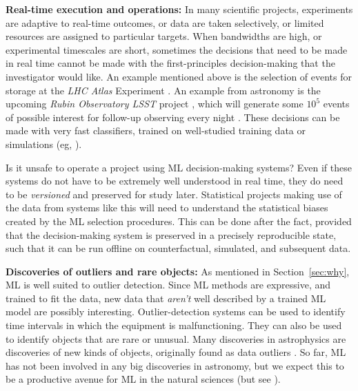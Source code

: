 \documentclass{article}
\renewcommand{\paragraph}[1]{\noindent\par\textbf{#1}}
\newcommand{\sectionname}{Section}
\newcommand{\secref}[1]{\sectionname~\ref{#1}}
\begin{document}
\paragraph{Real-time execution and operations:}
In many scientific projects, experiments are adaptive to real-time outcomes, or data are taken selectively, or limited resources are assigned to particular targets.
When bandwidths are high, or experimental timescales are short, sometimes the decisions that need to be made in real time cannot be made with the first-principles decision-making that the investigator would like.
An example mentioned above is the selection of events for storage at the \textsl{LHC Atlas} Experiment \cite{atlas}.
An example from astronomy is the upcoming \textsl{Rubin Observatory LSST} project \cite{rubin}, which will generate some $10^5$ events of possible interest for follow-up observing every night \cite{lsst_events}.
These decisions can be made with very fast classifiers, trained on well-studied training data or simulations (eg, \citealt{lsst_broker}).

Is it unsafe to operate a project using ML decision-making systems?
Even if these systems do not have to be extremely well understood in real time, they do need to be \emph{versioned} and preserved for study later.
Statistical projects making use of the data from systems like this will need to understand the statistical biases created by the ML selection procedures.
This can be done after the fact, provided that the decision-making system is preserved in a precisely reproducible state, such that it can be run offline on counterfactual, simulated, and subsequent data.

\paragraph{Discoveries of outliers and rare objects:}
As mentioned in \secref{sec:why}, ML is well suited to outlier detection.
Since ML methods are expressive, and trained to fit the data, new data that \emph{aren't} well described by a trained ML model are possibly interesting.
Outlier-detection systems can be used to identify time intervals in which the equipment is malfunctioning.
They can also be used to identify objects that are rare or unusual.
Many discoveries in astrophysics are discoveries of new kinds of objects, originally found as data outliers \cite{quasars, voorwerp}.
So far, ML has not been involved in any big discoveries in astronomy, but we expect this to be a productive avenue for ML in the natural sciences (but see \citealt{contardo}).
\end{document}
